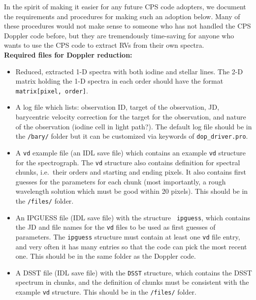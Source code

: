 In the spirit of making it easier for any future CPS code adopters, we
document the requirements and procedures for making such an adoption
below. Many of these procedures would not make sense to someone who
has not handled the CPS Doppler code before, but they are tremendously
time-saving for anyone who wants to use the CPS code to extract RVs
from their own spectra.\\

{\bf Required files for Doppler reduction:}
\begin{itemize}
\item Reduced, extracted 1-D spectra with both iodine and stellar
  lines. The 2-D matrix holding the 1-D spectra in each order should
  have the format {\tt matrix[pixel, order]}.
\item A log file which lists: observation ID, target of the
  observation, JD, barycentric velocity correction for the target for
  the observation, and nature of the observation (iodine cell in light
  path?). The default log file should be in the {\tt /bary/} folder but
  it can be customized via keywords of {\tt dop\_driver.pro}.
\item A {\tt vd} example file (an IDL save file) which contains an
  example {\tt vd} structure for the spectrograph. The {\tt vd}
  structure also contains definition for spectral chunks, i.e.\ their
  orders and starting and ending pixels. It also contains first guesses
  for the parameters for each chunk (most importantly, a rough
  wavelength solution which must be good within 20 pixels). This should
  be in the {\tt /files/} folder.
\item An IPGUESS file (IDL save file) with the structure {\tt
    ipguess}, which contains the JD and file names for the {\tt vd} files
  to be used as first guesses of parameters. The {\tt ipguess} structure
  must contain at least one {\tt vd} file entry, and very often it has
  many entries so that the code can pick the most recent one. This
  should be in the same folder as the Doppler code.
\item A DSST file (IDL save file) with the {\tt DSST} structure, which
  contains the DSST spectrum in chunks, and the definition of chunks
  must be consistent with the example {\tt vd} structure. This should be
  in the {\tt /files/} folder.
\end{itemize}

